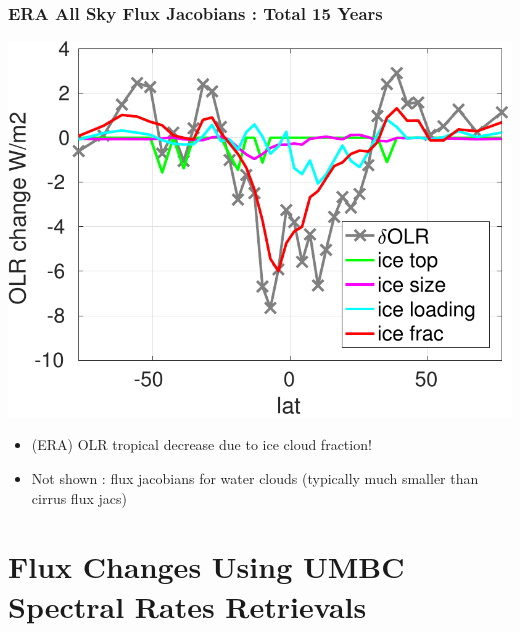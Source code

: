 \documentclass[10pt,t]{beamer}
\begin{document}
\begin{frame}
  \frametitle{ERA All Sky Flux Jacobians : Total 15 Years}
  \vspace{-0.1in}  
  \begin{center}
    \noindent\includegraphics[width=0.75\linewidth]{Figs//allsky_cloud_fluxjacs.pdf}
  \end{center}
  \vspace{-0.1in}
  \begin{itemize}
  \item (ERA) OLR tropical decrease due to ice cloud fraction!
  \item Not shown : flux jacobians for water clouds (typically much smaller than cirrus flux jacs)
  \end{itemize}
  
  
\end{frame}
\section{Flux Changes Using UMBC Spectral Rates Retrievals}
\end{document}
